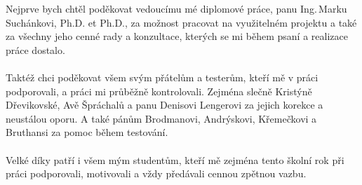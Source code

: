 \documentclass[czech,master,unicode]{ctufit-thesis}
\begin{document}
 
\frontmatter\frontmatterinit %
\thispagestyle{empty}\maketitle\thispagestyle{empty}\cleardoublepage %


\imprintpage %
\stopTOCentries

\begin{acknowledgmentpage}
    Nejprve bych chtěl poděkovat vedoucímu mé diplomové práce, panu Ing.\,Marku Suchánkovi, Ph.D. et Ph.D., za možnost pracovat na využitelném projektu a také za všechny jeho cenné rady a konzultace, kterých se mi během psaní a realizace práce dostalo.
\\\\
    Taktéž chci poděkovat všem svým přátelům a testerům, kteří mě v práci podporovali, a práci mi průběžně kontrolovali. Zejména slečně Kristýně Dřevikovské, Avě Špráchalů a panu Denisovi Lengerovi za jejich korekce a neustálou oporu. A také pánům
    Brodmanovi,
    Andrýskovi,
    Křemečkovi
    a
    Bruthansi 
    za pomoc během testování.
\\\\
    Velké díky patří i všem mým studentům, kteří mě zejména tento školní rok při práci podporovali, motivovali a vždy předávali cennou zpětnou vazbu. 
\end{acknowledgmentpage} 
\end{document}
